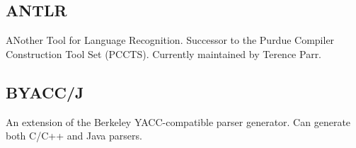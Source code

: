 \subsection*{ANTLR}

ANother Tool for Language Recognition. Successor to the Purdue Compiler Construction Tool Set (PCCTS). Currently maintained by Terence Parr.

\subsection*{BYACC/J}

An extension of the Berkeley YACC-compatible parser generator. Can generate both C/C++ and Java parsers.


